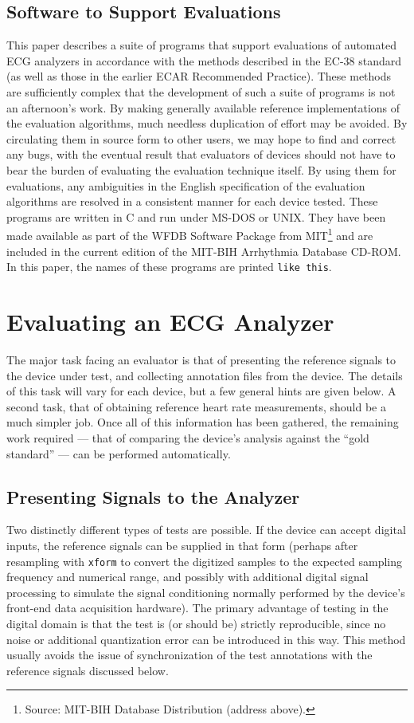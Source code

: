 \subsection{Software to Support Evaluations}
This paper describes a suite of programs that support evaluations
of automated ECG analyzers in accordance with the methods described in
the EC-38 standard (as well as those in the earlier ECAR Recommended
Practice).  These methods are sufficiently complex that the
development of such a suite of programs is not an afternoon's work.
By making generally available reference implementations of the
evaluation algorithms, much needless duplication of effort may be
avoided.  By circulating them in source form to other users, we may
hope to find and correct any bugs, with the eventual result that
evaluators of devices should not have to bear the burden of evaluating
the evaluation technique itself.  By using them for evaluations, any
ambiguities in the English specification of the evaluation algorithms
are resolved in a consistent manner for each device tested.  These
programs are written in C and run under MS-DOS or UNIX.  They have
been made available as part of the WFDB Software Package
from MIT\footnote{Source: MIT-BIH Database Distribution
(address above).} and are included in the current edition of the
MIT-BIH Arrhythmia Database CD-ROM.  In this paper, the names of these
programs are printed {\tt like this}.

\section{Evaluating an ECG Analyzer}
The major task facing an evaluator is that of presenting the reference signals
to the device under test, and collecting annotation files from the device.  The
details of this task will vary for each device, but a few general hints are
given below.  A second task, that of obtaining reference heart rate
measurements, should be a much simpler job.  Once all of this information has
been gathered, the remaining work required --- that of comparing the device's
analysis against the ``gold standard'' --- can be performed automatically.

\subsection{Presenting Signals to the Analyzer}
Two distinctly different types of tests are possible.  If the device can accept
digital inputs, the reference signals can be supplied in that form (perhaps
after resampling with {\tt xform} to convert the digitized samples to the
expected sampling frequency and numerical range, and possibly with additional
digital signal processing to simulate the signal conditioning normally
performed by the device's front-end data acquisition hardware).  The primary
advantage of testing in the digital domain is that the test is (or should be)
strictly reproducible, since no noise or additional quantization error can be
introduced in this way.  This method usually avoids the issue of
synchronization of the test annotations with the reference signals discussed
below.

